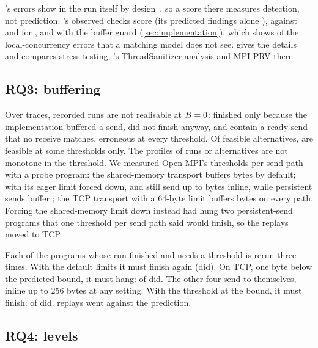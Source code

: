 \MBB's errors show in the run itself by design~\citep{jammer24quality}, so a score there measures
detection, not prediction: \tool's observed checks score \MBBfoneunion (its predicted findings alone
\MBBfonepredicted), against \MBBfoneMUST and \MBBfoneMUSTsym for \MUST, and \MBBfoneguard with the buffer
guard (\cref{sec:implementation}), which shows \nMBBLCguard of the \nMBBLC local-concurrency errors
that a matching model does not see.  gives the details and compares stress testing,
\MUST's ThreadSanitizer analysis and MPI-PRV there.

\subsection{RQ3: buffering}

Over \nEtwoTraces traces, \nEtwoObsBuf recorded runs are not realisable at $B=0$:
\nEtwoObsBufFinished finished only because the implementation buffered a send,
\nEtwoObsBufStopped did not finish anyway, and \nEtwoObsBufNever contain a ready send that no
receive matches, erroneous at every threshold. Of \nEtwoAlts feasible
alternatives, \nEtwoBdep are feasible at some thresholds only. The profiles of
\nEtwoNonmono runs or alternatives are not monotone in the threshold. We measured Open MPI's thresholds per send path with a probe program: the
shared-memory transport buffers \BimplOMPI bytes by default; with its eager limit forced down,
 and  still send up to \BminOMPI bytes inline, while persistent
sends buffer \BpersOMPI; the TCP transport with a 64-byte limit buffers \BtcpOMPI bytes on
every path. Forcing the shared-memory limit down instead had hung two persistent-send programs
that one threshold per send path said would finish, so the replays moved to TCP.

Each of the \nEtwoReplayPrograms programs whose run finished and needs a threshold is rerun
three times. With the default limits it must finish again (\nEtwoReplayDefaultOK did). On TCP,
one byte below the predicted bound, it must hang: \nEtwoReplayBelowOK of
\nEtwoReplayBelowTestable did. The other four send to themselves, inline up to 256 bytes at
any setting. With the threshold at the bound, it must finish: \nEtwoReplayAtOK of
\nEtwoReplayAt did. \nEtwoReplayBad replays went against the prediction.

\subsection{RQ4: levels}

